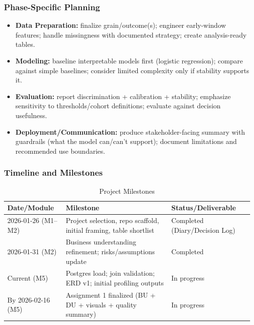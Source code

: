 \documentclass[12pt]{article}
\begin{document}
\subsubsection*{Phase-Specific Planning}
\begin{itemize}[leftmargin=1.5em]
    \item \textbf{Data Preparation:} finalize grain/outcome(s); engineer early-window features; handle missingness with documented strategy; create analysis-ready tables.
    \item \textbf{Modeling:} baseline interpretable models first (logistic regression); compare against simple baselines; consider limited complexity only if stability supports it.
    \item \textbf{Evaluation:} report discrimination + calibration + stability; emphasize sensitivity to thresholds/cohort definitions; evaluate against decision usefulness.
    \item \textbf{Deployment/Communication:} produce stakeholder-facing summary with guardrails (what the model can/can't support); document limitations and recommended use boundaries.
\end{itemize}

\subsubsection*{Timeline and Milestones}
\begin{table}[H]
\centering
\caption{Project Milestones}
\label{tab:milestones}
\begin{tabular}{p{3.0cm} p{5.3cm} p{4.1cm}}
\toprule
\textbf{Date/Module} & \textbf{Milestone} & \textbf{Status/Deliverable} \\
\midrule
2026-01-26 (M1--M2) & Project selection, repo scaffold, initial framing, table shortlist & Completed (Diary/Decision Log) \\
2026-01-31 (M2) & Business understanding refinement; risks/assumptions update & Completed \\
Current (M5) & Postgres load; join validation; ERD v1; initial profiling outputs & In progress \\
By 2026-02-16 (M5) & Assignment 1 finalized (BU + DU + visuals + quality summary) & In progress \\
\bottomrule
\end{tabular}
\end{table}
\end{document}
